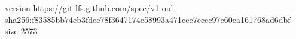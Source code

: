 version https://git-lfs.github.com/spec/v1
oid sha256:f83585bb74eb3fdee78f3647174e58993a471cee7ecec97e60ea161768ad6dbf
size 2573
